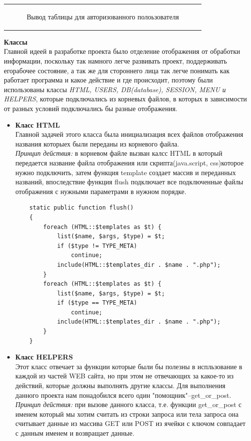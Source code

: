 \documentclass[a4paper]{article}
\begin{document}
\begin{enumerate}
\begin{tabular}{c}
\begin{minipage}{\textwidth}
\begin{figure}[H]
\caption{Вывод таблицы для авторизованного полоьзователя}
\end{figure}
\end{minipage}
\end{tabular}
\textbf{Классы}\\Главной идеей в разработке проекта было отделение отображения от обработки информации, поскольку так намного легче развивать проект, поддерживать егорабочее состояние, а так же для стороннего лица так легче понимать как работает программа и какое действие и где происходит, поэтому были использованы классы \textsl{HTML, USERS, DB(database), SESSION, MENU и HELPERS}, которые подключались из корневых файлов, в которых в зависимости от разных условий подключались бы разные отображения.

\begin{itemize} 
\item \textbf{Класс HTML}\\ 
Главной задачей этого класса была инициализация всех файлов отображения названия которыех были переданы из корневого файла.\\ \textsl{Принцип действия:} в корневом файле вызван калсс HTML в который передается название файла отображения или скрипта(java.script, css)которое нужно подключить, затем  функция template создает массив и переданных названий, впоследствие функция flush подключает все подключенные файлы отображения с нужными параметрами в нужном порядке.
\begin{small}
\begin{verbatim}  
    static public function flush()
    {
        foreach (HTML::$templates as $t) {
            list($name, $args, $type) = $t;
            if ($type != TYPE_META)
                continue;
            include(HTML::$templates_dir . $name . ".php");
        }
        foreach (HTML::$templates as $t) {
            list($name, $args, $type) = $t;
            if ($type == TYPE_META)
                continue;
            include(HTML::$templates_dir . $name . ".php");
        }
    }
\end{verbatim}
\end{small}
\item \textbf{Класс HELPERS}\\
Этот класс отвечает за функции которые были бы полезны в испльзование в каждой из частей WEB сайта, но при этом не отвечающих за какое-то из действий, которые должны выполнять другие классы. Для выполнения данного проекта нам понадобился всего один "помощник"\---get\_or\_post.\\ \textsl{Принцип действия:} при вызове данного класса, т.е. функции get\_or\_post с именем который мы хотим считать из строки запроса или тела запроса она считывает данные из массива GET или POST из ячейки с ключом совпадает с данным  именем и возвращает данные.

\end{itemize}
\end{enumerate}
\end{document}
